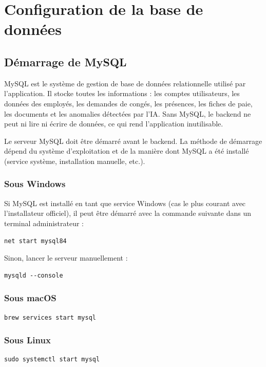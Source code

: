 \documentclass[12pt,a4paper]{report}
\begin{document}
\chapter{Configuration de la base de données}

\section{Démarrage de MySQL}

MySQL est le système de gestion de base de données relationnelle utilisé par l'application. Il stocke toutes les informations : les comptes utilisateurs, les données des employés, les demandes de congés, les présences, les fiches de paie, les documents et les anomalies détectées par l'IA. Sans MySQL, le backend ne peut ni lire ni écrire de données, ce qui rend l'application inutilisable.

Le serveur MySQL doit être démarré avant le backend. La méthode de démarrage dépend du système d'exploitation et de la manière dont MySQL a été installé (service système, installation manuelle, etc.).

\subsection{Sous Windows}

Si MySQL est installé en tant que service Windows (cas le plus courant avec l'installateur officiel), il peut être démarré avec la commande suivante dans un terminal administrateur :
\begin{verbatim}
net start mysql84
\end{verbatim}

Sinon, lancer le serveur manuellement :
\begin{verbatim}
mysqld --console
\end{verbatim}

\subsection{Sous macOS}
\begin{verbatim}
brew services start mysql
\end{verbatim}

\subsection{Sous Linux}
\begin{verbatim}
sudo systemctl start mysql
\end{verbatim}
\end{document}
